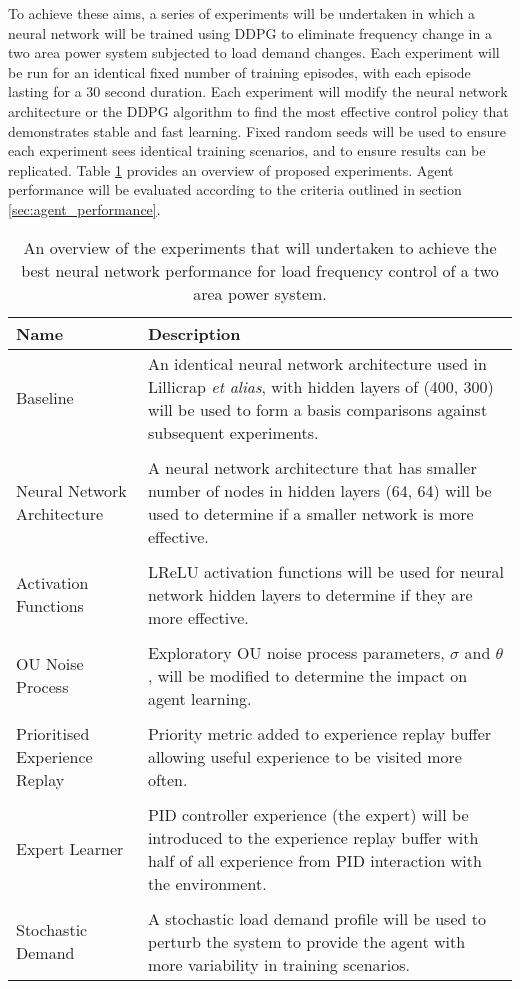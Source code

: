 To achieve these aims, a series of experiments will be undertaken in which a neural network will be trained using DDPG to eliminate frequency change in a two area power system subjected to load demand changes. Each experiment will be run for an identical fixed number of training episodes, with each episode lasting for a 30 second duration. Each experiment will modify the neural network architecture or the DDPG algorithm to find the most effective control policy that demonstrates stable and fast learning. Fixed random seeds will be used to ensure each experiment sees identical training scenarios, and to ensure results can be replicated. Table \ref{tab:experiment_overview} provides an overview of proposed experiments. Agent performance will be evaluated according to the criteria outlined in section \ref{sec:agent_performance}.
\begin{table}[h]
	\centering
	\caption{An overview of the experiments that will undertaken to achieve the best neural network performance for load frequency control of a two area power system.}\label{tab:experiment_overview}
	\begin{tabular}{lp{9cm}}
		\toprule
		\textbf{Name} & \textbf{Description} \\
		\midrule
		Baseline & An identical neural network architecture used in Lillicrap \textit{et alias}, with hidden layers of (400, 300) will be used to form a basis comparisons against subsequent experiments.\\
		 & \\
		Neural Network Architecture & A neural network architecture that has smaller number of nodes in hidden layers (64, 64) will be used to determine if a smaller network is more effective. \\
		 & \\
		Activation Functions & LReLU activation functions will be used for neural network hidden layers to determine if they are more effective.\\
		 & \\
		OU Noise Process & Exploratory OU noise process parameters, $\sigma$ and $\theta$, will be modified to determine the impact on agent learning. \\
		 & \\
		Prioritised Experience Replay & Priority metric added to experience replay buffer allowing useful experience  to be visited more often.\\
		 & \\
		Expert Learner & PID controller experience (the expert) will be introduced to the experience replay buffer with half of all experience from PID interaction with the environment.\\
		 & \\
		Stochastic Demand & A stochastic load demand profile will be used to perturb the system to provide the agent with more variability in training scenarios.\\
		\bottomrule
	\end{tabular}
\end{table}




